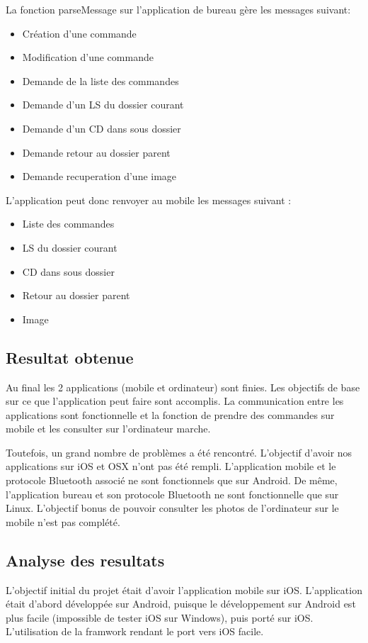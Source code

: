 \documentclass[12pt,fleqn]{article}
\begin{document}
La fonction parseMessage sur l'application de bureau gère les messages suivant:
\begin{itemize}
\item Création d'une commande
\item Modification d'une commande
\item Demande de la liste des commandes
\item Demande d'un LS du dossier courant
\item Demande d'un CD dans sous dossier
\item Demande retour au dossier parent
\item Demande recuperation d'une image
\end{itemize}
L'application peut donc renvoyer au mobile les messages suivant :
\begin{itemize}
\item Liste des commandes
\item LS du dossier courant
\item CD dans sous dossier
\item Retour au dossier parent
\item Image
\end{itemize}

\subsection{Resultat obtenue}
Au final les 2 applications (mobile et ordinateur) sont finies. Les objectifs de base sur ce que l’application peut faire sont accomplis. La communication entre les applications sont fonctionnelle et la fonction de prendre des commandes sur mobile et les consulter sur l’ordinateur marche.

Toutefois, un grand nombre de problèmes a été rencontré. L’objectif d’avoir nos applications sur iOS et OSX n’ont pas été rempli. L’application mobile et le protocole Bluetooth associé ne sont fonctionnels que sur Android. De même, l’application bureau et son protocole Bluetooth ne sont fonctionnelle que sur Linux. L’objectif bonus de pouvoir consulter les photos de l’ordinateur sur le mobile n’est pas complété.


\subsection{Analyse des resultats}
L’objectif initial du projet était d’avoir l’application mobile sur iOS. L’application était d’abord développée sur Android, puisque le développement sur Android est plus facile (impossible de tester iOS sur Windows), puis porté sur iOS. L’utilisation de la framwork rendant le port vers iOS facile.
\end{document}
